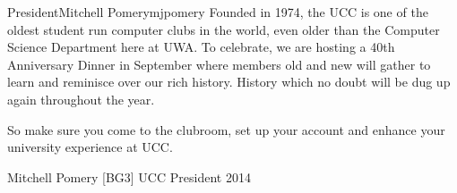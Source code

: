 \begin{welcome}{President}{Mitchell Pomery}{mjpomery}
Founded in 1974, the UCC is one of the oldest student run computer clubs in the world, even older than the Computer Science Department here at UWA.
To celebrate, we are hosting a 40th Anniversary Dinner in September where members old and new will gather to learn and reminisce over our rich history.
History which no doubt will be dug up again throughout the year.

So make sure you come to the clubroom, set up your account and enhance your university experience at UCC.

Mitchell Pomery [BG3]
UCC President 2014
\end{welcome}






